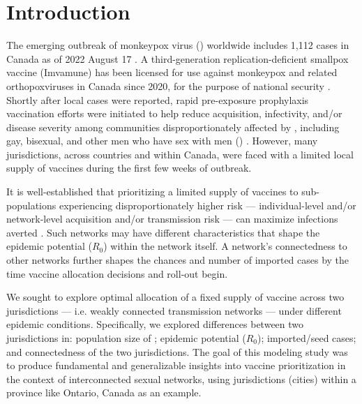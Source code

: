 \section{Introduction}
The emerging outbreak of monkeypox virus (\MPXV) worldwide includes
1,112 cases in Canada as of 2022 August 17 \cite{PHAC2022epi}.
A third-generation replication-deficient smallpox vaccine (Imvamune\rtm) has been
licensed for use against monkeypox and related orthopoxviruses in Canada since 2020,
for the purpose of national security \cite{PHAC2022vax}.
Shortly after local cases were reported,
rapid pre-exposure prophylaxis vaccination efforts were initiated
to help reduce acquisition, infectivity, and/or disease severity
among communities disproportionately affected by \MPXV, including
gay, bisexual, and other men who have sex with men (\GBMSM) \cite{TPH2022vax}.
However, many jurisdictions, across countries and within Canada,
were faced with a limited local supply of vaccines
during the first few weeks of \MPXV outbreak.
\par
It is well-established that prioritizing a limited supply of vaccines
to sub-populations experiencing disproportionately higher risk
--- individual-level and/or network-level acquisition and/or transmission risk ---
can maximize infections averted \cite{Garnett2005,Mishra2021}.
Such networks may have different characteristics that shape
the epidemic potential ($R_0$) within the network itself.
A network's connectedness to other networks further shapes
the chances and number of imported cases
by the time vaccine allocation decisions and roll-out begin.
\par
We sought to explore optimal allocation of a fixed supply of \MPXV vaccine
across two jurisdictions --- i.e. weakly connected transmission networks ---
under different epidemic conditions.
Specifically, we explored differences between two jurisdictions in:
population size of \GBMSM; epidemic potential ($R_0$); imported/seed cases;
and connectedness of the two jurisdictions.
The goal of this modeling study was to produce fundamental and generalizable insights into
\MPXV vaccine prioritization in the context of interconnected sexual networks,
using jurisdictions (cities) within a province like Ontario, Canada as an example.
